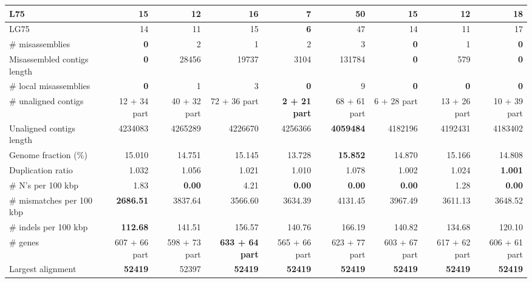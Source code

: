 \documentclass[12pt,a4paper]{article}
\begin{document}
\begin{table}[ht]
\begin{center}
\begin{tabular}{|l*{8}{|r}|}
L75 & 15 & 12 & 16 & {\bf 7} & 50 & 15 & 12 & 18 \\ \hline
LG75 & 14 & 11 & 15 & {\bf 6} & 47 & 14 & 11 & 17 \\ \hline
\# misassemblies & {\bf 0} & 2 & 1 & 2 & 3 & {\bf 0} & 1 & {\bf 0} \\ \hline
Misassembled contigs length & {\bf 0} & 28456 & 19737 & 3104 & 131784 & {\bf 0} & 579 & {\bf 0} \\ \hline
\# local misassemblies & {\bf 0} & 1 & 3 & {\bf 0} & 9 & {\bf 0} & {\bf 0} & {\bf 0} \\ \hline
\# unaligned contigs & 12 + 34 part & 40 + 32 part & 72 + 36 part & {\bf 2 + 21 part} & 68 + 61 part & 6 + 28 part & 13 + 26 part & 10 + 39 part \\ \hline
Unaligned contigs length & 4234083 & 4265289 & 4226670 & 4256366 & {\bf 4059484} & 4182196 & 4192431 & 4183402 \\ \hline
Genome fraction (\%) & 15.010 & 14.751 & 15.145 & 13.728 & {\bf 15.852} & 14.870 & 15.166 & 14.808 \\ \hline
Duplication ratio & 1.032 & 1.056 & 1.021 & 1.010 & 1.078 & 1.002 & 1.024 & {\bf 1.001} \\ \hline
\# N's per 100 kbp & 1.83 & {\bf 0.00} & 4.21 & {\bf 0.00} & {\bf 0.00} & {\bf 0.00} & 1.28 & {\bf 0.00} \\ \hline
\# mismatches per 100 kbp & {\bf 2686.51} & 3837.64 & 3566.60 & 3634.39 & 4131.45 & 3967.49 & 3611.13 & 3648.52 \\ \hline
\# indels per 100 kbp & {\bf 112.68} & 141.51 & 156.57 & 140.76 & 166.19 & 140.82 & 134.68 & 120.10 \\ \hline
\# genes & 607 + 66 part & 598 + 73 part & {\bf 633 + 64 part} & 565 + 66 part & 623 + 77 part & 603 + 67 part & 617 + 62 part & 606 + 61 part \\ \hline
Largest alignment & {\bf 52419} & 52397 & {\bf 52419} & {\bf 52419} & {\bf 52419} & {\bf 52419} & {\bf 52419} & {\bf 52419} \\ \hline
\end{tabular}
\end{center}
\end{table}
\end{document}
